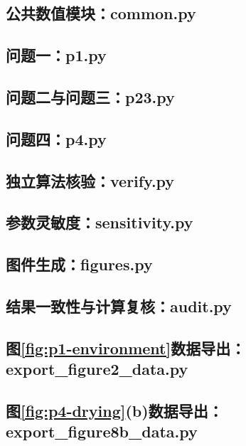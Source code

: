\begin{appendices}
\subsection{公共数值模块：common.py}

\subsection{问题一：p1.py}

\subsection{问题二与问题三：p23.py}

\subsection{问题四：p4.py}

\subsection{独立算法核验：verify.py}

\subsection{参数灵敏度：sensitivity.py}

\subsection{图件生成：figures.py}

\subsection{结果一致性与计算复核：audit.py}

\subsection{图\ref{fig:p1-environment}数据导出：export\_figure2\_data.py}

\subsection{图\ref{fig:p4-drying}(b)数据导出：export\_figure8b\_data.py}

\endgroup
\end{appendices}

